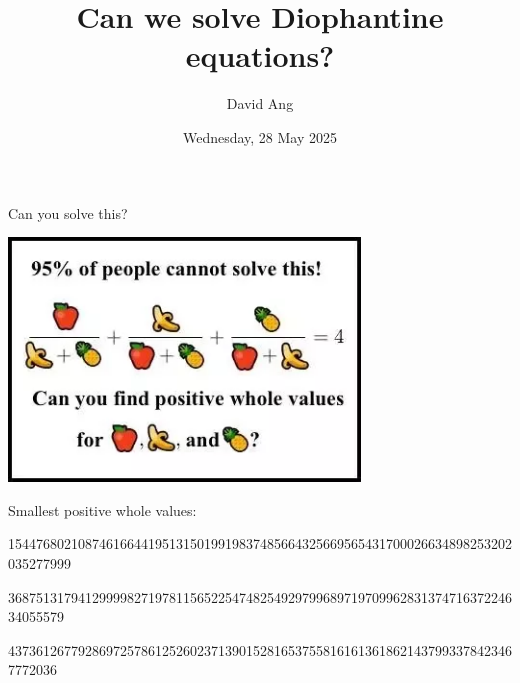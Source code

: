\documentclass[10pt]{beamer}
\title{Can we solve Diophantine equations?}
\author{David Ang}
\institute{University College London}
\date{Wednesday, 28 May 2025}
\theoremstyle{definition}
\begin{document}
\frame{\titlepage}

\begin{frame}[t]{Can you solve this?}

\begin{center}
\includegraphics[width=0.7\textwidth]{positive_whole_values.png}
\end{center}

\begin{center}
Smallest positive whole values:

\scriptsize \vspace{0.3cm}

154476802108746166441951315019919837485664325669565431700026634898253202035277999

\vspace{0.1cm}

36875131794129999827197811565225474825492979968971970996283137471637224634055579

\vspace{0.1cm}

4373612677928697257861252602371390152816537558161613618621437993378423467772036
\end{center}

\end{frame}
\end{document}
